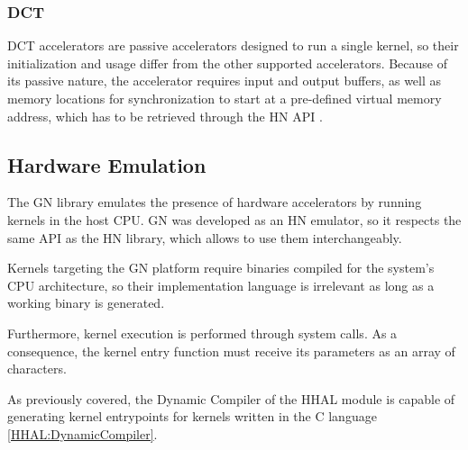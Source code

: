 \subsubsection{DCT}

DCT accelerators are passive accelerators designed to run a single kernel, so their initialization and usage differ from the other supported accelerators. Because of its passive nature, the accelerator requires input and output buffers, as well as memory locations for synchronization to start at a pre-defined virtual memory address, which has to be retrieved through the HN API \cite{mango_exploring_manycore_architectures_2.1}.

\subsection{Hardware Emulation}

The GN library emulates the presence of hardware accelerators by running kernels in the host CPU.
GN was developed as an HN emulator, so it respects the same API as the HN library, which allows to use them interchangeably.

Kernels targeting the GN platform require binaries compiled for the system's CPU architecture, so their implementation language is irrelevant as long as a working binary is generated. 

Furthermore, kernel execution is performed through system calls. As a consequence, the kernel entry function must receive its parameters as an array of characters.

As previously covered, the Dynamic Compiler of the HHAL module is capable of generating kernel entrypoints for kernels written in the C language \ref{HHAL:DynamicCompiler}.

